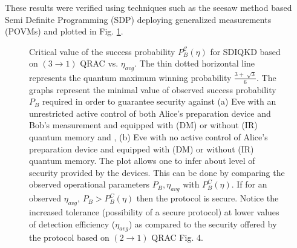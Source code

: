 \documentclass[smallextended]{svjour3}
\begin{document}
These results were verified using techniques such as the seesaw method based Semi Definite Programming (SDP) deploying generalized measurements (POVMs) and plotted in Fig. \ref{maxpe3}.
\begin{figure}[!]
\centering
{}
\caption{Critical value of the success probability $P_B^{\mathcal{C}}(\eta)$ for SDIQKD based on $(3\to1)$ QRAC vs. $\eta_{avg}$. The thin dotted horizontal line represents the quantum maximum winning probability $\frac{3+\sqrt[]{3}}{6}$.
The graphs represent the minimal value of observed success probability $P_B$ required in order to guarantee security against (a) Eve with an unrestricted active control of both Alice's preparation device and Bob's measurement and equipped with (DM) or without (IR) quantum memory and , (b) Eve with no active control of Alice's preparation device and equipped with (DM) or without (IR) quantum memory. The plot allows one to infer about level of security provided by the devices. This can be done by comparing the observed operational parameters $P_B,\eta_{avg}$ with $P_B^C(\eta)$. If for an observed $\eta_{avg}$, $P_B>P_B^C(\eta)$ then the protocol is secure. Notice the increased tolerance (possibility of a secure protocol) at lower values of detection efficiency ($\eta_{avg}$) as compared to the security offered by the protocol based on $(2\to 1)$ QRAC Fig. 4. }
\label{maxpe3}
\end{figure}
\end{document}
